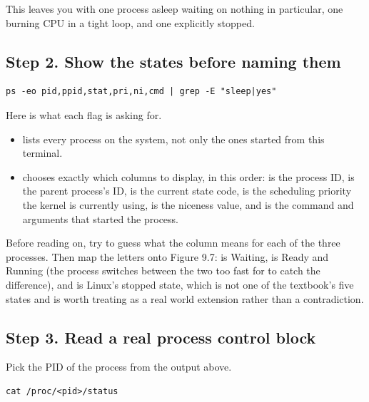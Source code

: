\documentclass[11pt]{article}
\begin{document}
This leaves you with one process asleep waiting on nothing in particular, one burning CPU in a tight loop, and one explicitly stopped.

\subsection*{Step 2. Show the states before naming them}

\begin{lstlisting}
ps -eo pid,ppid,stat,pri,ni,cmd | grep -E "sleep|yes"
\end{lstlisting}

Here is what each flag is asking for.

\begin{itemize}[leftmargin=1.4em]
  \item {} lists every process on the system, not only the ones started from this terminal.
  \item {} chooses exactly which columns to display, in this order:  is the process ID,  is the parent process's ID,  is the current state code,  is the scheduling priority the kernel is currently using,  is the niceness value, and  is the command and arguments that started the process.
\end{itemize}

Before reading on, try to guess what the  column means for each of the three processes. Then map the letters onto Figure 9.7:  is Waiting,  is Ready and Running (the process switches between the two too fast for  to catch the difference), and  is Linux's stopped state, which is not one of the textbook's five states and is worth treating as a real world extension rather than a contradiction.

\subsection*{Step 3. Read a real process control block}

Pick the PID of the  process from the output above.

\begin{lstlisting}
cat /proc/<pid>/status
\end{lstlisting}
\end{document}
